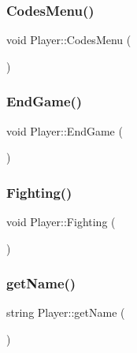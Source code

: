 \mbox{\label{class_player_a28e5f8eafd2b969be00a75d9acde3693}} 
\subsubsection{\texorpdfstring{Codes\+Menu()}{CodesMenu()}}
{\footnotesize\ttfamily void Player\+::\+Codes\+Menu (\begin{DoxyParamCaption}{ }\end{DoxyParamCaption})}

\mbox{\label{class_player_ae73a73ebaf54a546d29cd76e95df1d88}} 
\subsubsection{\texorpdfstring{End\+Game()}{EndGame()}}
{\footnotesize\ttfamily void Player\+::\+End\+Game (\begin{DoxyParamCaption}{ }\end{DoxyParamCaption})}

\mbox{\label{class_player_aea0f1b80c9c3e2ea3beede26b9b2b51a}} 
\subsubsection{\texorpdfstring{Fighting()}{Fighting()}}
{\footnotesize\ttfamily void Player\+::\+Fighting (\begin{DoxyParamCaption}{ }\end{DoxyParamCaption})}

\mbox{\label{class_player_af9a6045fa96f736664c4eab4caa5e8e5}} 
\subsubsection{\texorpdfstring{get\+Name()}{getName()}}
{\footnotesize\ttfamily string Player\+::get\+Name (\begin{DoxyParamCaption}{ }\end{DoxyParamCaption})\hspace{0.3cm}{\ttfamily [inline]}}

